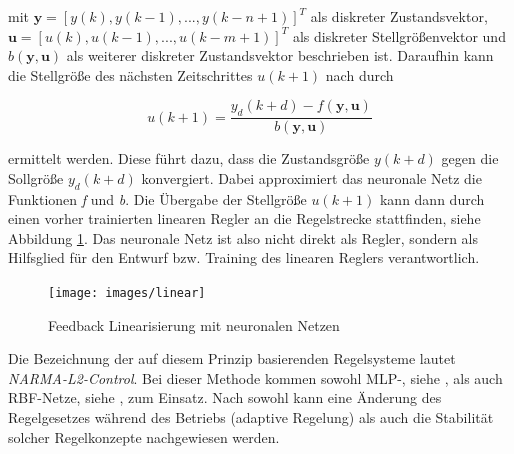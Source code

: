 mit $\textbf{y} = [y(k), y(k-1), ... , y(k-n+1)]^{T}$ als diskreter Zustandsvektor,          $\textbf{u} = [u(k), u(k-1),... ,u(k-m+1)]^{T}$ als diskreter Stellgrößenvektor und $b(\textbf{y},\textbf{u})$ als weiterer diskreter Zustandsvektor beschrieben ist.
Daraufhin kann die Stellgröße des nächsten Zeitschrittes $u(k+1)$ nach \cite{Mohammadzaheri.2012} durch 

\begin{equation} 
u(k+1) = \frac{y_d(k+d) - f(\textbf{y},\textbf{u})}{b(\textbf{y},\textbf{u})}
\end{equation}

ermittelt werden. Diese führt dazu, dass die Zustandsgröße $y(k+d)$ gegen die Sollgröße $y_d(k+d)$ konvergiert. Dabei approximiert das neuronale Netz die Funktionen \textit{f} und \textit{b}. Die Übergabe der Stellgröße $u(k+1)$ kann dann durch einen vorher trainierten linearen Regler an die Regelstrecke stattfinden, siehe Abbildung \ref{fig:linear}. Das neuronale Netz ist also nicht direkt als Regler, sondern als Hilfsglied für den Entwurf bzw. Training des linearen Reglers verantwortlich.

\begin{figure} [h]
	\centering
	\texttt{[image: images/linear]}
	\caption{Feedback Linearisierung mit neuronalen Netzen \cite{Sklyarenko.2002}}
	\label{fig:linear}
\end{figure}

Die Bezeichnung der auf diesem Prinzip basierenden Regelsysteme lautet \textit{NARMA-L2-Control}. Bei dieser Methode kommen sowohl MLP-, siehe \cite{Leeghim.2008}, als auch RBF-Netze, siehe \cite{Deng.2008}, zum Einsatz. Nach \cite{Leeghim.2008} sowohl kann eine Änderung des Regelgesetzes während des Betriebs (adaptive Regelung) als auch die Stabilität solcher Regelkonzepte nachgewiesen werden.





